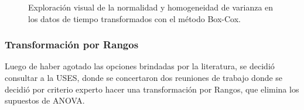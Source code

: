 \begin{figure}[H]
\centering
\caption{Exploración visual de la normalidad y homogeneidad de varianza en los datos de tiempo transformados con el método Box-Cox.}
\label{fig:transformacion-bc}
\end{figure}


\subsubsection{Transformación por Rangos}

Luego de haber agotado las opciones brindadas por la literatura, se decidió consultar a la USES, donde se concertaron dos reuniones de trabajo donde se decidió por criterio experto hacer una transformación por Rangos, que elimina los supuestos de ANOVA\cite{USES2014}\cite{SAS2004}.

